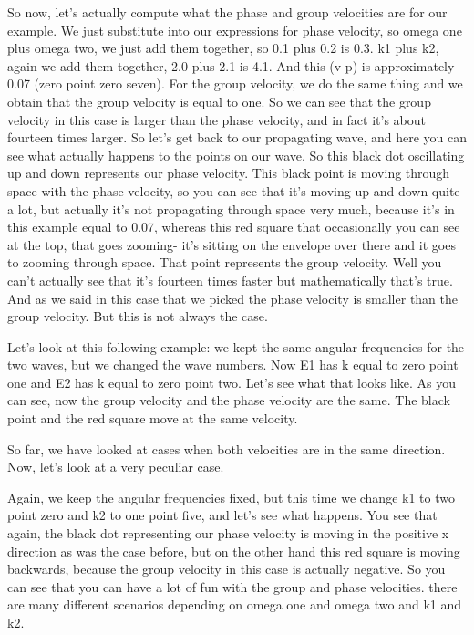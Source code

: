 So now, let's actually compute what the phase and group velocities are for our example. We just substitute into our expressions for phase velocity, so omega one plus omega two, we just add them together, so 0.1 plus 0.2 is 0.3. k1 plus k2, again we add them together, 2.0 plus 2.1 is 4.1. And this (v-p) is approximately 0.07 (zero point zero seven). For the group velocity, we do the same thing and we obtain that the group velocity is equal to one. So we can see that the group velocity in this case is larger than the phase velocity, and in fact it's about fourteen times larger. So let's get back to our propagating wave, and here you can see what actually happens to the points on our wave. So this black dot oscillating up and down represents our phase velocity. This black point is moving through space with the phase velocity, so you can see that it's moving up and down quite a lot, but actually it's not propagating through space very much, because it's in this example equal to 0.07, whereas this red square that occasionally you can see at the top, that goes zooming- it's sitting on the envelope over there and it goes to zooming through space. That point represents the group velocity. Well you can't actually see that it's fourteen times faster but mathematically that's true. And as we said in this case that we picked the phase velocity is smaller than the group velocity. But this is not always the case.

Let's look at this following example: we kept the same angular frequencies for the two waves, but we changed the wave numbers. Now E1 has k equal to zero point one and E2 has k equal to zero point two. Let's see what that looks like. As you can see, now the group velocity and the phase velocity are the same. The black point and the red square move at the same velocity.

So far, we have looked at cases when both velocities are in the same direction. Now, let's look at a very peculiar case.

Again, we keep the angular frequencies fixed, but this time we change k1 to two point zero and k2 to one point five, and let's see what happens. You see that again, the black dot representing our phase velocity is moving in the positive x direction as was the case before, but on the other hand this red square is moving backwards, because the group velocity in this case is actually negative. So you can see that you can have a lot of fun with the group and phase velocities. there are many different scenarios depending on omega one and omega two and k1 and k2.

